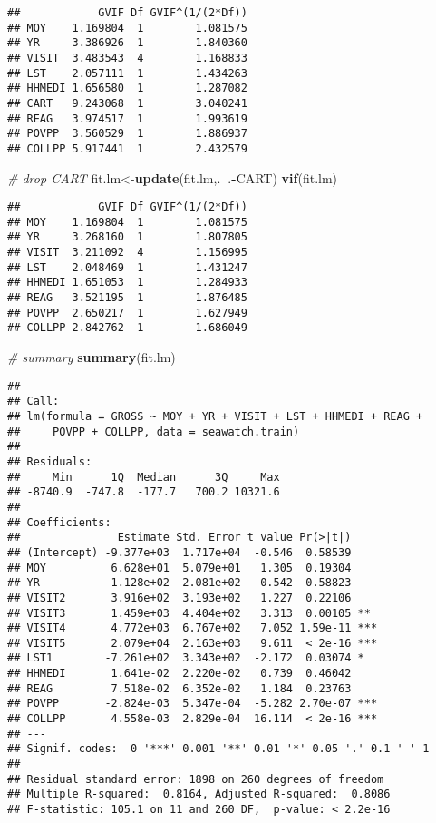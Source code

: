 \documentclass[]{article}
\newenvironment{Shaded}{\begin{snugshade}}{\end{snugshade}}
\newcommand{\KeywordTok}[1]{\textcolor[rgb]{0.13,0.29,0.53}{\textbf{#1}}}
\newcommand{\CommentTok}[1]{\textcolor[rgb]{0.56,0.35,0.01}{\textit{#1}}}
\newcommand{\OperatorTok}[1]{\textcolor[rgb]{0.81,0.36,0.00}{\textbf{#1}}}
\newcommand{\NormalTok}[1]{#1}
\begin{document}
\begin{verbatim}
##            GVIF Df GVIF^(1/(2*Df))
## MOY    1.169804  1        1.081575
## YR     3.386926  1        1.840360
## VISIT  3.483543  4        1.168833
## LST    2.057111  1        1.434263
## HHMEDI 1.656580  1        1.287082
## CART   9.243068  1        3.040241
## REAG   3.974517  1        1.993619
## POVPP  3.560529  1        1.886937
## COLLPP 5.917441  1        2.432579
\end{verbatim}

\begin{Shaded}
\begin{Highlighting}[]
\CommentTok{# drop CART}
\NormalTok{fit.lm<-}\KeywordTok{update}\NormalTok{(fit.lm,.}\OperatorTok{~}\NormalTok{.}\OperatorTok{-}\NormalTok{CART)}
\KeywordTok{vif}\NormalTok{(fit.lm)}
\end{Highlighting}
\end{Shaded}

\begin{verbatim}
##            GVIF Df GVIF^(1/(2*Df))
## MOY    1.169804  1        1.081575
## YR     3.268160  1        1.807805
## VISIT  3.211092  4        1.156995
## LST    2.048469  1        1.431247
## HHMEDI 1.651053  1        1.284933
## REAG   3.521195  1        1.876485
## POVPP  2.650217  1        1.627949
## COLLPP 2.842762  1        1.686049
\end{verbatim}

\begin{Shaded}
\begin{Highlighting}[]
\CommentTok{# summary }
\KeywordTok{summary}\NormalTok{(fit.lm)}
\end{Highlighting}
\end{Shaded}

\begin{verbatim}
## 
## Call:
## lm(formula = GROSS ~ MOY + YR + VISIT + LST + HHMEDI + REAG + 
##     POVPP + COLLPP, data = seawatch.train)
## 
## Residuals:
##     Min      1Q  Median      3Q     Max 
## -8740.9  -747.8  -177.7   700.2 10321.6 
## 
## Coefficients:
##               Estimate Std. Error t value Pr(>|t|)    
## (Intercept) -9.377e+03  1.717e+04  -0.546  0.58539    
## MOY          6.628e+01  5.079e+01   1.305  0.19304    
## YR           1.128e+02  2.081e+02   0.542  0.58823    
## VISIT2       3.916e+02  3.193e+02   1.227  0.22106    
## VISIT3       1.459e+03  4.404e+02   3.313  0.00105 ** 
## VISIT4       4.772e+03  6.767e+02   7.052 1.59e-11 ***
## VISIT5       2.079e+04  2.163e+03   9.611  < 2e-16 ***
## LST1        -7.261e+02  3.343e+02  -2.172  0.03074 *  
## HHMEDI       1.641e-02  2.220e-02   0.739  0.46042    
## REAG         7.518e-02  6.352e-02   1.184  0.23763    
## POVPP       -2.824e-03  5.347e-04  -5.282 2.70e-07 ***
## COLLPP       4.558e-03  2.829e-04  16.114  < 2e-16 ***
## ---
## Signif. codes:  0 '***' 0.001 '**' 0.01 '*' 0.05 '.' 0.1 ' ' 1
## 
## Residual standard error: 1898 on 260 degrees of freedom
## Multiple R-squared:  0.8164, Adjusted R-squared:  0.8086 
## F-statistic: 105.1 on 11 and 260 DF,  p-value: < 2.2e-16
\end{verbatim}
\end{document}
